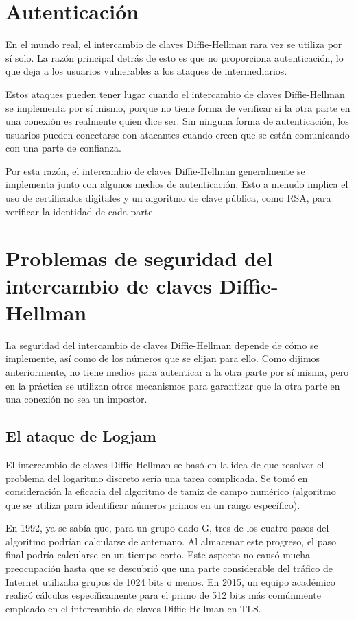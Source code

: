 \documentclass[11pt]{article}
\begin{document}
\section{Autenticación}

En el mundo real, el intercambio de claves Diffie-Hellman rara vez se utiliza por sí solo. La razón principal detrás de esto es que no proporciona autenticación, lo que deja a los usuarios vulnerables a los ataques de intermediarios.

Estos ataques pueden tener lugar cuando el intercambio de claves Diffie-Hellman se implementa por sí mismo, porque no tiene forma de verificar si la otra parte en una conexión es realmente quien dice ser. Sin ninguna forma de autenticación, los usuarios pueden conectarse con atacantes cuando creen que se están comunicando con una parte de confianza.

Por esta razón, el intercambio de claves Diffie-Hellman generalmente se implementa junto con algunos medios de autenticación. Esto a menudo implica el uso de certificados digitales y un algoritmo de clave pública, como RSA, para verificar la identidad de cada parte.


\section{Problemas de seguridad del intercambio de claves Diffie-Hellman}
La seguridad del intercambio de claves Diffie-Hellman depende de cómo se implemente, así como de los números que se elijan para ello. Como dijimos anteriormente, no tiene medios para autenticar a la otra parte por sí misma, pero en la práctica se utilizan otros mecanismos para garantizar que la otra parte en una conexión no sea un impostor.

\subsection {El ataque de Logjam}

El intercambio de claves Diffie-Hellman se basó en la idea de que resolver el problema del logaritmo discreto sería una tarea complicada. Se tomó en consideración la eficacia del algoritmo de tamiz de campo numérico (algoritmo que se utiliza para identificar números primos en un rango específico).

En 1992, ya se sabía que, para un grupo dado G, tres de los cuatro pasos del algoritmo podrían calcularse de antemano. Al almacenar este progreso, el paso final podría calcularse en un tiempo corto. Este aspecto no causó mucha preocupación hasta que se descubrió que una parte considerable del tráfico de Internet utilizaba grupos de 1024 bits o menos. En 2015, un equipo académico realizó cálculos específicamente para el primo de 512 bits más comúnmente empleado en el intercambio de claves Diffie-Hellman en TLS.
\end{document}
